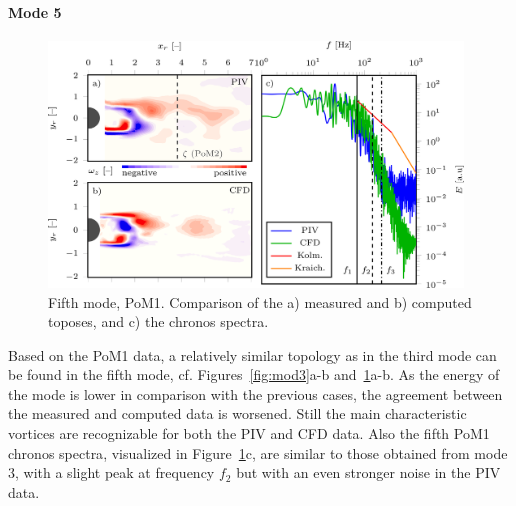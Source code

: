 {\paragraph{Mode 5}
\begin{figure}[htbp]
    \centering
    \includegraphics[width=0.98\textwidth]{02_images/00_export/figure15.png}
    \caption{{Fifth mode, PoM1.} Comparison of the a) measured and b) computed toposes, and c) the chronos spectra.}
    \label{fig:mod6}
\end{figure}
{Based on the PoM1 data, }{a} relatively similar topology as in the third mode can be found in the {fifth} mode, {cf.} Figures~\ref{fig:mod3}a-b {and~\ref{fig:mod6}a-b}. As the energy of the mode is lower in comparison with the previous cases, the agreement between the measured and computed data is {worsened}. {S}till the main characteristic vortices are recognizable for both {the PIV and CFD} data. Also the {fifth PoM1} chronos spectra{, visualized in Figure~\ref{fig:mod6}c,} are similar to those obtained from mode 3, with {a slight} peak at frequency $f_2$ {but with an} even stronger noise in the PIV data.

}
